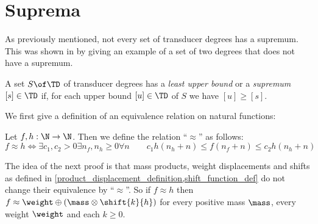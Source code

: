 \section{Suprema}
\label{suprema_section}

As previously mentioned, not every set of transducer degrees has a supremum. This was shown in \cite{streams:degrees:suprema:2020} by giving an example of a set of two degrees that does not have a supremum.

\begin{definition}
	A set $S\of\TD$ of transducer degrees has a \textit{least upper bound} or a \textit{supremum} $[s]\in\TD$ if, for each upper bound $[u]\in\TD$ of $S$ we have $[u] \geq [s]$.
\end{definition}


We first give a definition of an equivalence relation on natural functions:

\begin{definition}
	Let $f,h: \N \to \N$. Then we define the relation ``$\approx$'' as follows:
	$$f \approx h \iff \exists c_1,c_2>0 \exists n_f,n_h\geq 0 \forall n\qquad c_1h(n_h + n) \leq f(n_f + n) \leq c_2 h(n_h +n)$$ 
\end{definition}

The idea of the next proof is that mass products, weight displacements and shifts as defined in \cref{product_displacement_definition,shift_function_def} do not change their equivalence by ``$\approx$''. So if $f \approx h$ then $f \approx \weight \oplus (\mass \otimes \shift{k}{h})$ for every positive mass $\mass$, every weight $\weight$ and each $k\geq 0$.


